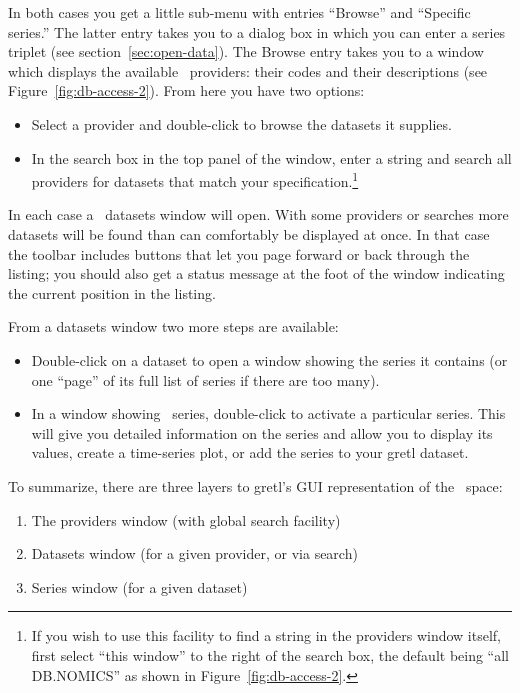 \documentclass{article}
\begin{document}
In both cases you get a little sub-menu with entries
``\textsf{Browse}'' and ``\textsf{Specific series}.'' The latter entry
takes you to a dialog box in which you can enter a series triplet (see
section~\ref{sec:open-data}). The \textsf{Browse} entry takes you to a
window which displays the available \DB\ providers: their codes and
their descriptions (see Figure~\ref{fig:db-access-2}). From here you
have two options:
\begin{itemize}
\item Select a provider and double-click to browse the datasets it
  supplies.
\item In the search box in the top panel of the window, enter a string
  and search all providers for datasets that match your
  specification.\footnote{If you wish to use this facility to find a
    string in the providers window itself, first select ``\textsf{this
      window}'' to the right of the search box, the default being
    ``\textsf{all DB.NOMICS}'' as shown in
    Figure~\ref{fig:db-access-2}.}
\end{itemize}

In each case a \DB\ datasets window will open. With some
providers or searches more datasets will be found than can comfortably
be displayed at once. In that case the toolbar includes buttons that
let you page forward or back through the listing; you should also get
a status message at the foot of the window indicating the current
position in the listing.

From a datasets window two more steps are available:
\begin{itemize}
\item Double-click on a dataset to open a window showing the series it
  contains (or one ``page'' of its full list of series if there are
  too many).
\item In a window showing \DB\ series, double-click to
  activate a particular series. This will give you detailed
  information on the series and allow you to display its values,
  create a time-series plot, or add the series to your gretl dataset.
\end{itemize}

To summarize, there are three layers to gretl's GUI representation of
the \DB\ space:
\begin{enumerate}
\item The providers window (with global search facility)
\item Datasets window (for a given provider, or via search)
\item Series window (for a given dataset)
\end{enumerate}
\end{document}
